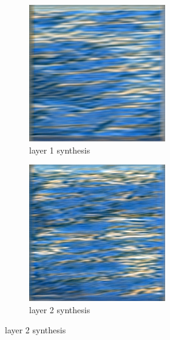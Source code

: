 \documentclass[11pt, oneside]{article}   	%
\begin{document}
\begin{figure}[H]
    \centering
    \begin{subfigure}[b]{0.45\textwidth}
        \includegraphics[width=\textwidth]{figure/water/layer_01_001}
        \caption{layer 1 synthesis}
    \end{subfigure}
    \begin{subfigure}[b]{0.45\textwidth}
        \includegraphics[width=\textwidth]{figure/water/layer_02_001}
        \caption{layer 2 synthesis}
    \end{subfigure}
    

\end{figure}
\end{document}

